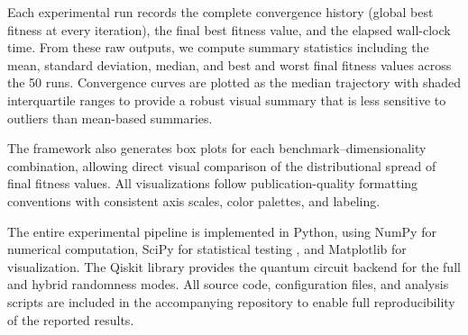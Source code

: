 Each experimental run records the complete convergence history (global best fitness at every iteration), the final best fitness value, and the elapsed wall-clock time. From these raw outputs, we compute summary statistics including the mean, standard deviation, median, and best and worst final fitness values across the 50 runs. Convergence curves are plotted as the median trajectory with shaded interquartile ranges to provide a robust visual summary that is less sensitive to outliers than mean-based summaries.

The framework also generates box plots for each benchmark--dimensionality combination, allowing direct visual comparison of the distributional spread of final fitness values. All visualizations follow publication-quality formatting conventions with consistent axis scales, color palettes, and labeling.

The entire experimental pipeline is implemented in Python, using NumPy for numerical computation, SciPy for statistical testing \cite{Virtanen2020}, and Matplotlib for visualization. The Qiskit library \cite{Qiskit2024} provides the quantum circuit backend for the full and hybrid randomness modes. All source code, configuration files, and analysis scripts are included in the accompanying repository to enable full reproducibility of the reported results.
